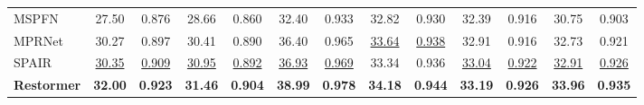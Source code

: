\documentclass[10pt,twocolumn,letterpaper]{article}
\def\xnet{Restormer\xspace}
\begin{document}
\begin{table*}
\begin{center}
{\begin{tabular}{l c c c c c c c c c c || c c}
MSPFN~\cite{mspfn2020}  & 27.50 & 0.876 & 28.66 & 0.860 & 32.40 & 0.933 & 32.82 & 0.930 & 32.39 & 0.916 & 30.75 & 0.903\\
MPRNet~\cite{Zamir_2021_CVPR_mprnet}  & 30.27 & 0.897 & 30.41 & 0.890 & 36.40 & 0.965 & \underline{33.64} & \underline{0.938} & 32.91 & 0.916 & 32.73 & 0.921 \\
SPAIR~\cite{purohit2021spatially_spair} & \underline{30.35} & \underline{0.909} & \underline{30.95} & \underline{0.892} & \underline{36.93} & \underline{0.969} & 33.34 & 0.936 & \underline{33.04} &\underline{0.922} & \underline{32.91} & \underline{0.926} \\
\midrule
\textbf{\xnet} & \textbf{32.00} & \textbf{0.923} & \textbf{31.46} & \textbf{0.904} & \textbf{38.99} & \textbf{0.978} & \textbf{34.18} & \textbf{0.944} & \textbf{33.19} & \textbf{0.926} & \textbf{33.96} & \textbf{0.935} \\
\bottomrule[0.1em]
\end{tabular}}
\end{center}\vspace{-1.5em}
\end{table*}
 
\end{document}
